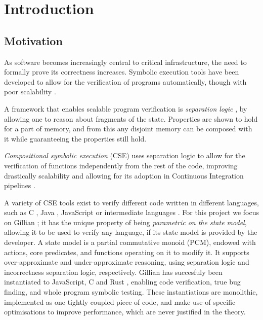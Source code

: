 \chapter{Introduction}

\section{Motivation}

As software becomes increasingly central to critical infrastructure, the need to formally prove its correctness increases. Symbolic execution tools have been developed to allow for the verification of programs automatically, though with poor scalability \cite{surveysymex}. 

 A framework that enables scalable program verification is \emph{separation logic} \cite{seplogic1,seplogic2}, by allowing one to reason about fragments of the state. Properties are shown to hold for a part of memory, and from this any disjoint memory can be composed with it while guaranteeing the properties still hold.

\emph{Compositional symbolic execution} (CSE) uses separation logic to allow for the verification of functions independently from the rest of the code, improving drastically scalability \cite{pathexplo} and allowing for its adoption in Continuous Integration pipelines \cite{pulse}.

A variety of CSE tools exist to verify different code written in different languages, such as C \cite{verifast,infer,pulse}, Java \cite{jstar,verifast,infer,pulse}, JavaScript \cite{javert1} or intermediate languages \cite{corestar,viper,gillian0}. For this project we focus on Gillian \cite{gillian1,gillian2}; it has the unique property of being \emph{parametric on the state model}, allowing it to be used to verify any language, if its state model is provided by the developer. A state model is a partial commutative monoid (PCM), endowed with actions, core predicates, and functions operating on it to modify it. It supports over-approximate and under-approximate reasoning, using separation logic and incorrectness separation logic, respectively. Gillian has succesfuly been instantiated to JavaScript, C and Rust \cite{gillian0,gillianrust}, enabling code verification, true bug finding, and whole program symbolic testing. These instantiations are monolithic, implemented as one tightly coupled piece of code, and make use of specific optimisations to improve performance, which are never justified in the theory.


